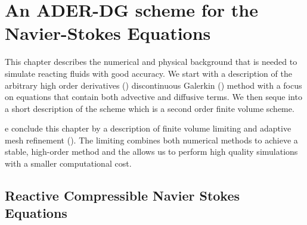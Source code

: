 
\chapter{An ADER-DG scheme for the Navier-Stokes Equations}\label{chap:methods}
This chapter describes the numerical and physical background that is needed to simulate reacting fluids with good accuracy.
We start with a description of the arbitrary high order derivatives (\ader{}) discontinuous Galerkin (\dg{}) method with a focus on equations that contain both advective and diffusive terms.
We then seque into a short description of the \muscl{} scheme which is a second order finite volume scheme.

e conclude this chapter by a description of finite volume limiting and adaptive mesh refinement (\amr{}).
The limiting combines both numerical methods to achieve a stable, high-order method and the \amr{} allows us to perform high quality simulations with a smaller computational cost.

\section{Reactive Compressible Navier Stokes Equations}\label{sec:navier-stokes}
\newcommand{\diffCoeff}{\varepsilon}
\newcommand{\hyperFluxDef}{
  \begin{pmatrix}
    \Qj \\
    \Qv  \otimes \Qj + \bm{I} \pressure  \\
    \Qv \cdot (\bm{I} \QE + \bm{I} \pressure) \\
    \Qj \QZZ
  \end{pmatrix}
}
\newcommand{\viscFluxDef}{
  \begin{pmatrix}
     -\diffCoeff \gradient{\Qrho}\\
     \stressT (\Q, \gradQ)  \\
     \Qv \cdot \stressT (\Q, \gradQ) - \kappa \gradient{T}\\
     -\diffCoeff \gradient{\QZ}
   \end{pmatrix}
}

